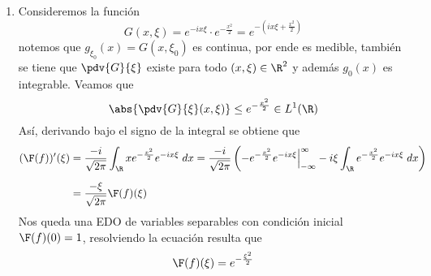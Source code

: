 \documentclass{article}
\begin{document}
\begin{enumerate}
    \item Consideremos la función
    \begin{equation*}
        G(x,\xi)=e^{-ix\xi}\cdot e^{-\frac{x^{2}}{2}}=e^{-(ix\xi+\frac{x^{2}}{2})}
    \end{equation*}
    notemos que $g_{\xi_{0}}(x)=G(x,\xi_{0})$ es continua, por ende es medible, también se tiene 
    que $\pdv{G}{\xi}$ existe para todo $(x,\xi)\in\R^{2}$ y además $g_{0}(x)$ es integrable.
    Veamos que
    \begin{equation*}
        \abs{\pdv{G}{\xi}(x,\xi)}\leq e^{-\frac{x^{2}}{2}}\in L^{1}(\R)
    \end{equation*}
    Así, derivando bajo el signo de la integral se obtiene que
    \begin{align*}
        (\F(f))'(\xi) &= \frac{-i}{\sqrt{2\pi}}\int_{\R}xe^{-\frac{x^{2}}{2}}
        e^{-ix\xi}\hspace{1mm}dx=\frac{-i}{\sqrt{2\pi}}\left(-e^{-\frac{x^{2}}{2}}e^{-ix\xi}
        \Big|_{-\infty}^{\infty}-i\xi\int_{\R}e^{-\frac{x^{2}}{2}}e^{-ix\xi}\hspace{1mm}dx
        \right) \\[2mm]
        &= \frac{-\xi}{\sqrt{2\pi}}\F(f)(\xi)
    \end{align*}
    Nos queda una EDO de variables separables con condición inicial $\F(f)(0)=1$, resolviendo la 
    ecuación resulta que
    \begin{equation*}
        \F(f)(\xi)=e^{-\frac{\xi^{2}}{2}}
    \end{equation*}
    

\end{enumerate}
\end{document}

